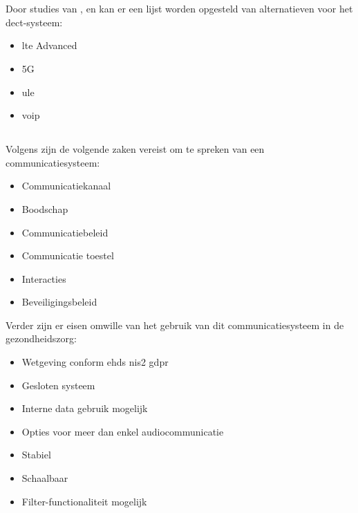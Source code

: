 \section{}%
\label{sec:label}%

Door studies van \textcite{Montalvo2024}, \textcite{Kranz2010} en \textcite{Soenmez2018} kan er een lijst worden opgesteld van alternatieven voor het \gls{dect}-systeem:

\begin{itemize}
  \item \gls{lte} Advanced
  \item 5G
  \item \gls{ule}
  \item \gls{voip}

\end{itemize}

\subsection{}%
\label{sec:minreq}%

Volgens \textcite{Coiera2006} zijn de volgende zaken vereist om te spreken van een communicatiesysteem:
\begin{itemize}
  \item Communicatiekanaal
  \item Boodschap
  \item Communicatiebeleid
  \item Communicatie toestel
  \item Interacties
  \item Beveiligingsbeleid
\end{itemize}

Verder zijn er eisen omwille van het gebruik van dit communicatiesysteem in de gezondheidszorg:

\begin{itemize}
  \item Wetgeving conform
  \subitem \gls{ehds}
  \subitem \gls{nis2}
  \subitem \gls{gdpr}
  \item Gesloten systeem
  \item Interne data gebruik mogelijk
  \item Opties voor meer dan enkel audiocommunicatie
  \item Stabiel
  \item Schaalbaar
  \item Filter-functionaliteit mogelijk
\end{itemize}

